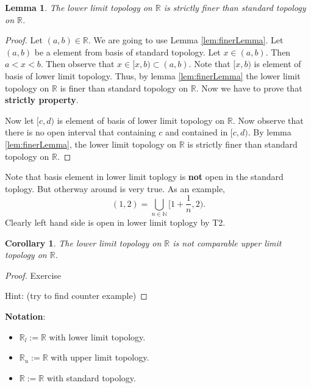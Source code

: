 \documentclass[
]{book}
\providecommand{\tightlist}{%
  \setlength{\itemsep}{0pt}\setlength{\parskip}{0pt}}
\newtheorem{lemma}{Lemma}[chapter]
\newtheorem{corollary}{Corollary}[chapter]
\theoremstyle{definition}
\theoremstyle{definition}
\theoremstyle{definition}
\theoremstyle{definition}
\theoremstyle{remark}
\begin{document}
\begin{lemma}
\protect\hypertarget{lem:unnamed-chunk-26}{}\label{lem:unnamed-chunk-26}The lower limit topology on \(\mathbb{R}\) is strictly finer than standard topology on \(\mathbb{R}\).
\end{lemma}

\begin{proof}
Let \((a,b)\in \mathbb{R}\). We are going to use Lemma \ref{lem:finerLemma}. Let \((a,b)\) be a element from basis of standard topology. Let \(x\in (a,b)\). Then \(a<x<b\). Then observe that \(x\in [x,b)\subset (a,b)\). Note that \([x,b)\) is element of basis of lower limit topology. Thus, by lemma \ref{lem:finerLemma} the lower limit topology on \(\mathbb{R}\) is finer than standard topology on \(\mathbb{R}\). Now we have to prove that \textbf{strictly property}.

Now let \([c,d)\) is element of basis of lower limit topology on \(\mathbb{R}\). Now observe that there is no open interval that containing \(c\) and contained in \([c,d)\). By lemma \ref{lem:finerLemma}, the lower limit topology on \(\mathbb{R}\) is strictly finer than standard topology on \(\mathbb{R}\).
\end{proof}

Note that basis element in lower limit toplogy is \textbf{not} open in the standard toplogy. But otherway around is very true. As an example, \[(1,2)=\bigcup_{n\in \mathbb{N}}[1+\frac{1}{n},2).\] Clearly left hand side is open in lower limit toplogy by T2.

\begin{corollary}
\protect\hypertarget{cor:unnamed-chunk-28}{}\label{cor:unnamed-chunk-28}The lower limit topology on \(\mathbb{R}\) is not comparable upper limit topology on \(\mathbb{R}\).
\end{corollary}

\begin{proof}
Exercise

Hint: (try to find counter example)
\end{proof}

\textbf{Notation}:

\begin{itemize}
\tightlist
\item
  \(\mathbb{R}_l:=\mathbb{R}\) with lower limit topology.
\item
  \(\mathbb{R}_u:=\mathbb{R}\) with upper limit topology.
\item
  \(\mathbb{R}:=\mathbb{R}\) with standard topology.
\end{itemize}
\end{document}
